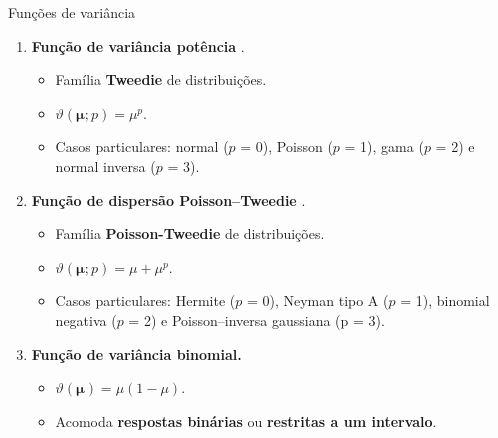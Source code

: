 \documentclass[
  ignorenonframetext,
  serif,
  professionalfont,
  usenames,
  dvipsnames,
  aspectratio = 169]{beamer}
\begin{document}
\begin{frame}{Funções de variância}
\protect\hypertarget{funuxe7uxf5es-de-variuxe2ncia}{}
\begin{enumerate}
  \item \textbf{Função de variância potência} \citep{Jorgensen87, Jorgensen97}.
  
    \begin{itemize}
      \item Família \textbf{Tweedie} de distribuições.
      \item $\vartheta\left(\boldsymbol{\mu}; p\right) = \mu^p$.
      \item Casos particulares: normal ($p$ = 0), Poisson ($p$ = 1), gama ($p$ = 2) e normal inversa ($p$ = 3).
    \end{itemize}

  
  \item \textbf{Função de dispersão Poisson–Tweedie} \citep{Jorgensen15}.
  
    \begin{itemize}
      \item Família \textbf{Poisson-Tweedie} de distribuições.
      \item $\vartheta\left(\boldsymbol{\mu}; p\right) = \mu + \mu^p$.
      \item Casos particulares: Hermite ($p$ = 0), Neyman tipo A ($p$ = 1), binomial negativa ($p$ = 2) e Poisson–inversa gaussiana (p = $3$).
      
    \end{itemize}

  \item \textbf{Função de variância binomial.} 
  
    \begin{itemize}
      \item $\vartheta(\boldsymbol{\mu}) = \mu(1 - \mu)$.
      \item Acomoda \textbf{respostas binárias} ou \textbf{restritas a um intervalo}.
    \end{itemize}

\end{enumerate}
\end{frame}
\end{document}

